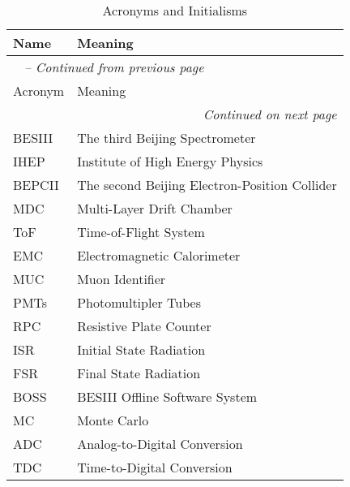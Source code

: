 \begin{longtable}{p{} p{}}
\caption{Acronyms and Initialisms}
\label{tab:acronyms} \\

\toprule
Name & Meaning \\
\midrule
\endfirsthead

\multicolumn{2}{l}{\textit{\tablename\ \thetable{} -- Continued from previous page}} \\
\toprule
Acronym & Meaning \\
\midrule
\endhead

\multicolumn{2}{r}{\textit{Continued on next page}} \\
\bottomrule
\endfoot

\bottomrule
\endlastfoot


    BESIII & The third Beijing Spectrometer \\
    IHEP   & Institute of High Energy Physics \\
    BEPCII & The second Beijing Electron-Position Collider \\
    MDC    & Multi-Layer Drift Chamber \\
    ToF    & Time-of-Flight System \\
    EMC    & Electromagnetic Calorimeter \\
    MUC    & Muon Identifier \\
    PMTs   & Photomultipler Tubes \\
    RPC    & Resistive Plate Counter \\
    ISR    & Initial State Radiation \\
    FSR    & Final State Radiation \\
    BOSS   & BESIII Offline Software System \\
    MC     & Monte Carlo \\
    ADC    & Analog-to-Digital Conversion \\
    TDC    & Time-to-Digital Conversion \\
\end{longtable}
